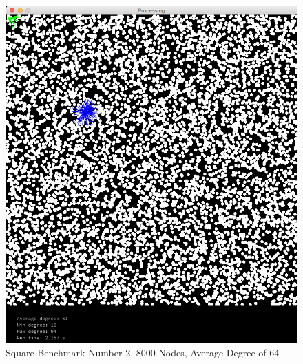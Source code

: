 \documentclass{article}
\begin{document}
\begin{figure}
    \centering
    \includegraphics[scale=0.45]{./images/square_1.png}
    \caption{Square Benchmark Number 2. 8000 Nodes, Average Degree of 64}
    \label{square1}
\end{figure}
\end{document}
